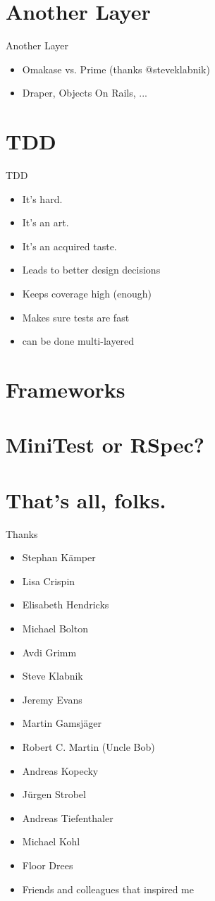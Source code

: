 \documentclass[style=paintings,display=slides,clock]{powerdot}
\begin{document}
\section{Another Layer}
\begin{note}{Another Layer}
	\begin{itemize}
		\item Omakase vs. Prime (thanks @steveklabnik)
		\item Draper, Objects On Rails, ...
	\end{itemize}
\end{note}
\section{TDD}
\begin{note}{TDD}
	\begin{itemize}
		\item It's hard.
		\item It's an art.
		\item It's an acquired taste.
		\item Leads to better design decisions
		\item Keeps coverage high (enough)
		\item Makes sure tests are fast
		\item can be done multi-layered
	\end{itemize}
\end{note}
\section{ Frameworks }
\section{ MiniTest or RSpec? }
\section{ That's all, folks. }
\begin{slide}{Thanks}
	\begin{itemize}
		\item Stephan Kämper
		\item Lisa Crispin
		\item Elisabeth Hendricks
		\item Michael Bolton
		\item Avdi Grimm
		\item Steve Klabnik
		\item Jeremy Evans
		\item Martin Gamsjäger
		\item Robert C. Martin (Uncle Bob)
		\item Andreas Kopecky
		\item Jürgen Strobel
		\item Andreas Tiefenthaler
		\item Michael Kohl
		\item Floor Drees
		\item Friends and colleagues that inspired me
	\end{itemize}
\end{slide}
\end{document}
